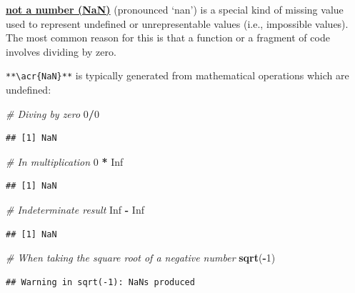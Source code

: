 \documentclass[
]{book}
\newenvironment{Shaded}{\begin{snugshade}}{\end{snugshade}}
\newcommand{\CommentTok}[1]{\textcolor[rgb]{0.56,0.35,0.01}{\textit{#1}}}
\newcommand{\ConstantTok}[1]{\textcolor[rgb]{0.56,0.35,0.01}{#1}}
\newcommand{\DecValTok}[1]{\textcolor[rgb]{0.00,0.00,0.81}{#1}}
\newcommand{\FunctionTok}[1]{\textcolor[rgb]{0.13,0.29,0.53}{\textbf{#1}}}
\newcommand{\NormalTok}[1]{#1}
\newcommand{\SpecialCharTok}[1]{\textcolor[rgb]{0.81,0.36,0.00}{\textbf{#1}}}
\begin{document}
\textbf{\hyperref[acronyms_NaN]{not a number (NaN)}} (pronounced `nan') is a special kind of missing value used to represent undefined or unrepresentable values (i.e., impossible values). The most common reason for this is that a function or a fragment of code involves dividing by zero.

\texttt{**\textbackslash{}acr\{NaN\}**} is typically generated from mathematical operations which are undefined:

\begin{Shaded}
\begin{Highlighting}[]
\CommentTok{\# Diving by zero}
\DecValTok{0}\SpecialCharTok{/}\DecValTok{0}
\end{Highlighting}
\end{Shaded}

\begin{verbatim}
## [1] NaN
\end{verbatim}

\begin{Shaded}
\begin{Highlighting}[]
\CommentTok{\# In multiplication}
\DecValTok{0} \SpecialCharTok{*} \ConstantTok{Inf}
\end{Highlighting}
\end{Shaded}

\begin{verbatim}
## [1] NaN
\end{verbatim}

\begin{Shaded}
\begin{Highlighting}[]
\CommentTok{\# Indeterminate result}
\ConstantTok{Inf} \SpecialCharTok{{-}} \ConstantTok{Inf}
\end{Highlighting}
\end{Shaded}

\begin{verbatim}
## [1] NaN
\end{verbatim}

\begin{Shaded}
\begin{Highlighting}[]
\CommentTok{\# When taking the square root of a negative number}
\FunctionTok{sqrt}\NormalTok{(}\SpecialCharTok{{-}}\DecValTok{1}\NormalTok{)}
\end{Highlighting}
\end{Shaded}

\begin{verbatim}
## Warning in sqrt(-1): NaNs produced
\end{verbatim}
\end{document}
